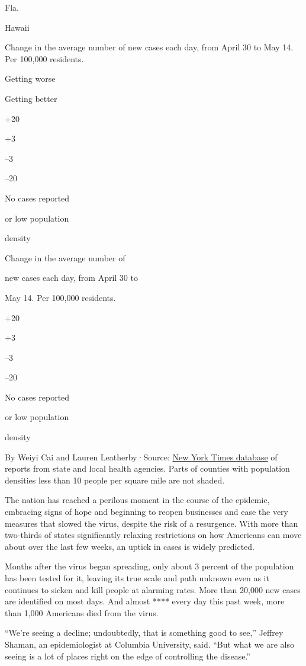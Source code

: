 Fla.

Hawaii

Change in the average number of new cases each day, from April 30 to May
14. Per 100,000 residents.

Getting worse

Getting better

+20

+3

--3

--20

No cases reported

or low population

density

Change in the average number of

new cases each day, from April 30 to

May 14. Per 100,000 residents.

+20

+3

--3

--20

No cases reported

or low population

density

By Weiyi Cai and Lauren Leatherby·Source:
\href{https://www.nytimes3xbfgragh.onion/interactive/2020/us/coronavirus-us-cases.html}{New
York Times database} of reports from state and local health agencies.
Parts of counties with population densities less than 10 people per
square mile are not shaded.

The nation has reached a perilous moment in the course of the epidemic,
embracing signs of hope and beginning to reopen businesses and ease the
very measures that slowed the virus, despite the risk of a resurgence.
With more than two-thirds of states significantly relaxing restrictions
on how Americans can move about over the last few weeks, an uptick in
cases is widely predicted.

Months after the virus began spreading, only about 3 percent of the
population has been tested for it, leaving its true scale and path
unknown even as it continues to sicken and kill people at alarming
rates. More than 20,000 new cases are identified on most days. And
almost **** every day this past week, more than 1,000 Americans died
from the virus.

``We're seeing a decline; undoubtedly, that is something good to see,''
Jeffrey Shaman, an epidemiologist at Columbia University, said. ``But
what we are also seeing is a lot of places right on the edge of
controlling the disease.''

